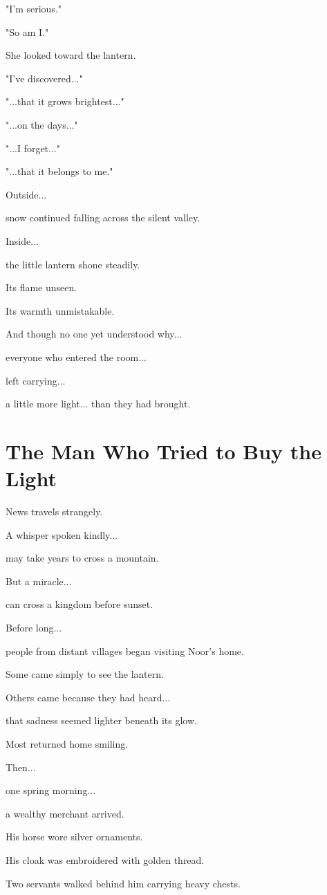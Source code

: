 \documentclass[12pt,openany]{book}
\begin{document}
"I'm serious."

"So am I."

She looked toward the lantern.

"I've discovered..."

"...that it grows brightest..."

"...on the days..."

"...I forget..."

"...that it belongs to me."

Outside...

snow continued falling across the silent valley.

Inside...

the little lantern shone steadily.

Its flame unseen.

Its warmth unmistakable.

And though no one yet understood why...

everyone who entered the room...

left carrying...

a little more light...
than they had brought.
\section*{The Man Who Tried to Buy the Light}

News travels strangely.

A whisper spoken kindly...

may take years to cross a mountain.

But a miracle...

can cross a kingdom before sunset.

Before long...

people from distant villages began visiting Noor's home.

Some came simply to see the lantern.

Others came because they had heard...

that sadness seemed lighter beneath its glow.

Most returned home smiling.

Then...

one spring morning...

a wealthy merchant arrived.

His horse wore silver ornaments.

His cloak was embroidered with golden thread.

Two servants walked behind him carrying heavy chests.
\end{document}
